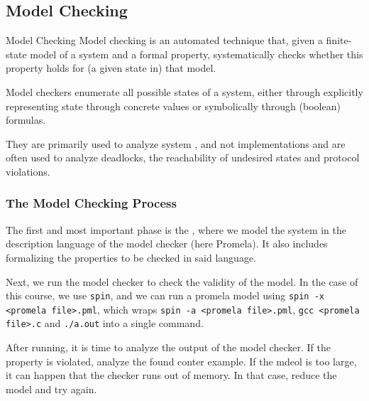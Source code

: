 \subsection{Model Checking}
\begin{definition}[]{Model Checking}
    Model checking is an automated technique that, given
    a finite-state model of a system and a formal property,
    systematically checks whether this property holds for
    (a given state in) that model.
\end{definition}

Model checkers enumerate all possible states of a system, either through explicitly representing state through concrete values or symbolically through (boolean) formulas.

They are primarily used to analyze system , and not implementations and are often used to analyze deadlocks, the reachability of undesired states and protocol violations.


\subsubsection{The Model Checking Process}
The first and most important phase is the , where we model the system in the description language of the model checker (here Promela).
It also includes formalizing the properties to be checked in said language.

Next, we run the model checker to check the validity of the model. 
In the case of this course, we use \texttt{spin}, and we can run a promela model using \texttt{spin -x <promela file>.pml},
which wraps \texttt{spin -a <promela file>.pml}, \texttt{gcc <promela file>.c} and \texttt{./a.out} into a single command.

After running, it is time to analyze the output of the model checker. If the property is violated, analyze the found conter example.
If the mdeol is too large, it can happen that the checker runs out of memory. In that case, reduce the model and try again.
